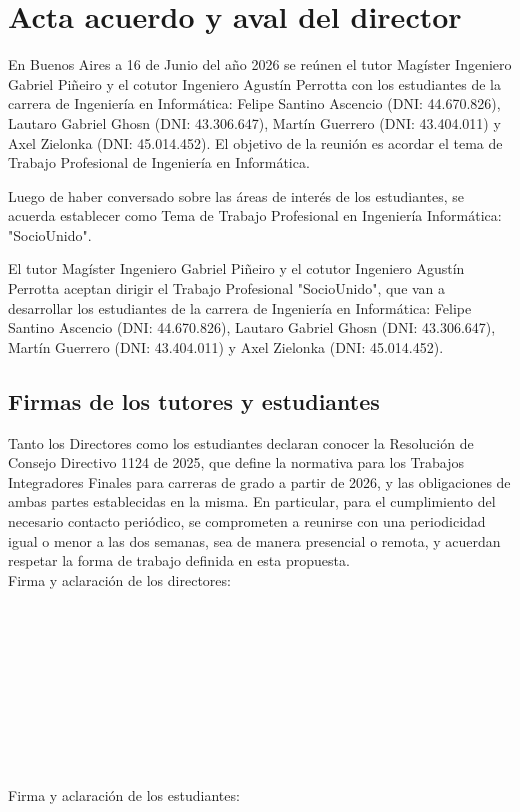\section{Acta acuerdo y aval del director}

En Buenos Aires a 16 de Junio del año 2026 se reúnen el tutor Magíster Ingeniero Gabriel Piñeiro y el cotutor Ingeniero Agustín Perrotta con los estudiantes de la carrera de Ingeniería en Informática: Felipe Santino Ascencio (DNI: 44.670.826), Lautaro Gabriel Ghosn (DNI: 43.306.647), Martín Guerrero (DNI: 43.404.011) y Axel Zielonka (DNI: 45.014.452). El objetivo de la reunión es acordar el tema de Trabajo Profesional de Ingeniería en Informática.

Luego de haber conversado sobre las áreas de interés de los estudiantes, se acuerda establecer como Tema de Trabajo Profesional en Ingeniería Informática: "SocioUnido".

El tutor Magíster Ingeniero Gabriel Piñeiro y el cotutor Ingeniero Agustín Perrotta aceptan dirigir el Trabajo Profesional "SocioUnido", que van a desarrollar los estudiantes de la carrera de Ingeniería en Informática: Felipe Santino Ascencio (DNI: 44.670.826), Lautaro Gabriel Ghosn (DNI: 43.306.647), Martín Guerrero (DNI: 43.404.011) y Axel Zielonka (DNI: 45.014.452).

\subsection{Firmas de los tutores y estudiantes}

Tanto los Directores como los estudiantes declaran conocer la Resolución de Consejo Directivo 1124 de 2025, que define la normativa para los Trabajos Integradores Finales para carreras de grado a partir de 2026, y las obligaciones de ambas partes establecidas en la misma. En particular, para el cumplimiento del necesario contacto periódico, se comprometen a reunirse con una periodicidad igual o menor a las dos semanas, sea de manera presencial o remota, y acuerdan respetar la forma de trabajo definida en esta propuesta.
\\

Firma y aclaración de los directores:
\\
\\
\\
\\
\\
\\
\\
\\
\\
\\
\\

Firma y aclaración de los estudiantes:
\\
